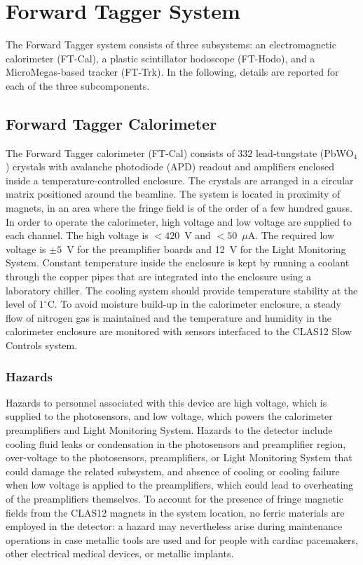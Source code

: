 \section{Forward Tagger System}

The Forward Tagger system consists of three subsystems: an electromagnetic calorimeter 
(FT-Cal), a plastic scintillator hodoscope (FT-Hodo), and a MicroMegas-based tracker 
(FT-Trk). In the following, details are reported for each of the three subcomponents.

\subsection{Forward Tagger Calorimeter}

The Forward Tagger calorimeter (FT-Cal) consists of $332$ lead-tungstate (PbWO$_4$) crystals 
with avalanche photodiode (APD) readout and amplifiers enclosed inside a temperature-controlled 
enclosure. The crystals are arranged in a circular matrix positioned around the beamline. The 
system is located in proximity of magnets, in an area where the fringe field is of the order of 
a few hundred gauss. In order to operate the calorimeter, high voltage and low voltage are 
supplied to each channel. The high voltage is $<420$~V and $<50$~$\mu$A. The required low voltage 
is $\pm 5$~V for the preamplifier boards and 12~V for the Light Monitoring System. Constant 
temperature inside the enclosure is kept by running a coolant through the copper pipes that 
are integrated into the enclosure using a laboratory chiller. The cooling system should provide 
temperature stability at the level of $1^\circ$C. To avoid moisture build-up in the calorimeter 
enclosure, a steady flow of nitrogen gas is maintained and the temperature and humidity in the 
calorimeter enclosure are monitored with sensors interfaced to the CLAS12 Slow Controls system.

\subsubsection{Hazards} 

Hazards to personnel associated with this device are high voltage, which is supplied to 
the photosensors, and low voltage, which powers the calorimeter preamplifiers and Light 
Monitoring System. Hazards to the detector include cooling fluid leaks or condensation in 
the photosensors and preamplifier region, over-voltage to the photosensors, preamplifiers, 
or Light Monitoring System that could damage the related subsystem, and absence of cooling or 
cooling failure when low voltage is applied to the preamplifiers, which could lead to 
overheating of the preamplifiers themselves. To account for the presence of fringe magnetic 
fields from the CLAS12 magnets in the system location, no ferric materials are employed in 
the detector: a hazard may nevertheless arise during maintenance operations in case metallic 
tools are used and for people with cardiac pacemakers, other electrical medical devices, or 
metallic implants.

